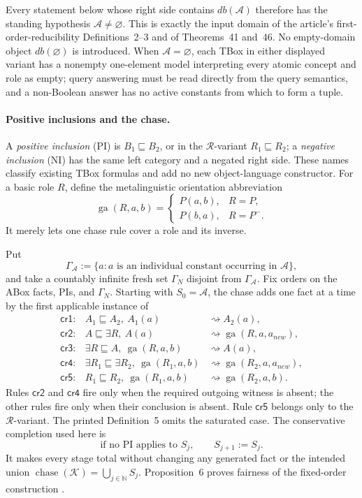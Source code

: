 Every statement below whose right side contains \(db(\mathcal A)\) therefore
has the standing hypothesis \(\mathcal A\ne\varnothing\).  This is exactly the
input domain of the article's first-order-reducibility Definitions~2--3 and of
Theorems~41 and~46.  No empty-domain object \(db(\varnothing)\) is introduced.
When \(\mathcal A=\varnothing\), each TBox in either displayed variant has a
nonempty one-element model interpreting every atomic concept and role as empty;
query answering must be read directly from the query semantics, and a
non-Boolean answer has no active constants from which to form a tuple.

\paragraph{Positive inclusions and the chase.}
A \emph{positive inclusion} (PI) is \(B_1\sqsubseteq B_2\), or in the
\(\mathcal R\)-variant \(R_1\sqsubseteq R_2\); a \emph{negative inclusion}
(NI) has the same left category and a negated right side.  These names classify
existing TBox formulas and add no new object-language constructor.  For a
basic role \(R\), define the metalinguistic orientation abbreviation
\[
 \operatorname{ga}(R,a,b)=
 \begin{cases}
  P(a,b),&R=P,\\
  P(b,a),&R=P^{-}.
 \end{cases}
\]
It merely lets one chase rule cover a role and its inverse.

Put
\[
 \Gamma_{\mathcal A}:=
 \{a:a\text{ is an individual constant occurring in }\mathcal A\},
\]
and take a countably infinite fresh set \(\Gamma_N\) disjoint from
\(\Gamma_{\mathcal A}\).  Fix orders on the ABox facts, PIs, and
\(\Gamma_N\).  Starting with \(S_0=\mathcal A\), the chase adds one fact at a time by
the first applicable instance of
\[
\begin{array}{lll}
 \mathsf{cr1}:&A_1\sqsubseteq A_2,\ A_1(a)
     &\rightsquigarrow A_2(a),\\
 \mathsf{cr2}:&A\sqsubseteq\exists R,\ A(a)
     &\rightsquigarrow\operatorname{ga}(R,a,a_{new}),\\
 \mathsf{cr3}:&\exists R\sqsubseteq A,\ \operatorname{ga}(R,a,b)
     &\rightsquigarrow A(a),\\
 \mathsf{cr4}:&\exists R_1\sqsubseteq\exists R_2,\
       \operatorname{ga}(R_1,a,b)
     &\rightsquigarrow\operatorname{ga}(R_2,a,a_{new}),\\
 \mathsf{cr5}:&R_1\sqsubseteq R_2,\ \operatorname{ga}(R_1,a,b)
     &\rightsquigarrow\operatorname{ga}(R_2,a,b).
\end{array}
\]
Rules \(\mathsf{cr2}\) and \(\mathsf{cr4}\) fire only when the required outgoing
witness is absent; the other rules fire only when their conclusion is absent.
Rule \(\mathsf{cr5}\) belongs only to the \(\mathcal R\)-variant.  The printed
Definition~5 omits the saturated case.  The conservative completion used here
is
\[
 \text{if no PI applies to }S_j,\qquad S_{j+1}:=S_j.
\]
It makes every stage total without changing any generated fact or the intended
union \(\operatorname{chase}(\mathcal K)=\bigcup_{j\in\mathbb N}S_j\).
Proposition~6 proves fairness of the fixed-order construction
\cite[defs.~4--5 and prop.~6]{CalvaneseEtAl2007}.

